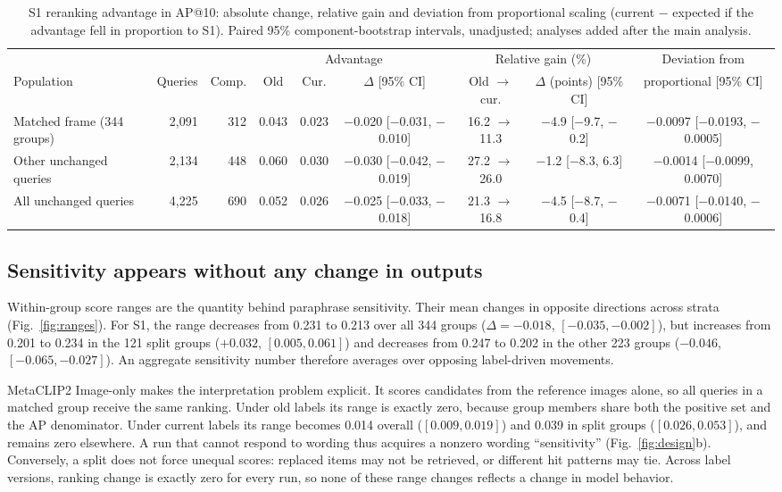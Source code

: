 \documentclass[conference]{IEEEtran}
\begin{document}
\begin{table}[!t]
\centering
\caption{S1 reranking advantage in AP@10: absolute change, relative gain and deviation from proportional scaling (current $-$ expected if the advantage fell in proportion to S1). Paired 95\% component-bootstrap intervals, unadjusted; analyses added after the main analysis.}
\label{tab:scaling}
\footnotesize
\setlength{\tabcolsep}{2.6pt}
\begin{tabular}{@{}lrrcccccc@{}}
\toprule
 & & & \multicolumn{3}{c}{Advantage} & \multicolumn{2}{c}{Relative gain (\%)} & Deviation from\\
\cmidrule(lr){4-6}\cmidrule(lr){7-8}
Population & Queries & Comp. & Old & Cur. & $\Delta$ [95\% CI] & Old $\rightarrow$ cur. & $\Delta$ (points) [95\% CI] & proportional [95\% CI]\\
\midrule
Matched frame (344 groups) & 2,091 & 312 & 0.043 & 0.023 & $-$0.020 [$-$0.031, $-$0.010] & 16.2 $\rightarrow$ 11.3 & $-$4.9 [$-$9.7, $-$0.2] & $-$0.0097 [$-$0.0193, $-$0.0005]\\
Other unchanged queries & 2,134 & 448 & 0.060 & 0.030 & $-$0.030 [$-$0.042, $-$0.019] & 27.2 $\rightarrow$ 26.0 & $-$1.2 [$-$8.3, 6.3] & $-$0.0014 [$-$0.0099, 0.0070]\\
All unchanged queries & 4,225 & 690 & 0.052 & 0.026 & $-$0.025 [$-$0.033, $-$0.018] & 21.3 $\rightarrow$ 16.8 & $-$4.5 [$-$8.7, $-$0.4] & $-$0.0071 [$-$0.0140, $-$0.0006]\\
\bottomrule
\end{tabular}
\end{table}

\subsection{Sensitivity appears without any change in outputs}\label{sec:res-range}
Within-group score ranges are the quantity behind paraphrase sensitivity. Their mean changes in opposite directions across strata (Fig.~\ref{fig:ranges}). For S1, the range decreases from 0.231 to 0.213 over all 344 groups ($\Delta=-0.018$, $[-0.035,-0.002]$), but increases from 0.201 to 0.234 in the 121 split groups ($+0.032$, $[0.005, 0.061]$) and decreases from 0.247 to 0.202 in the other 223 groups ($-0.046$, $[-0.065,-0.027]$). An aggregate sensitivity number therefore averages over opposing label-driven movements.

MetaCLIP2 Image-only makes the interpretation problem explicit. It scores candidates from the reference images alone, so all queries in a matched group receive the same ranking. Under old labels its range is exactly zero, because group members share both the positive set and the AP denominator. Under current labels its range becomes 0.014 overall ($[0.009, 0.019]$) and 0.039 in split groups ($[0.026, 0.053]$), and remains zero elsewhere. A run that cannot respond to wording thus acquires a nonzero wording ``sensitivity'' (Fig.~\ref{fig:design}b). Conversely, a split does not force unequal scores: replaced items may not be retrieved, or different hit patterns may tie. Across label versions, ranking change is exactly zero for every run, so none of these range changes reflects a change in model behavior.
\end{document}
